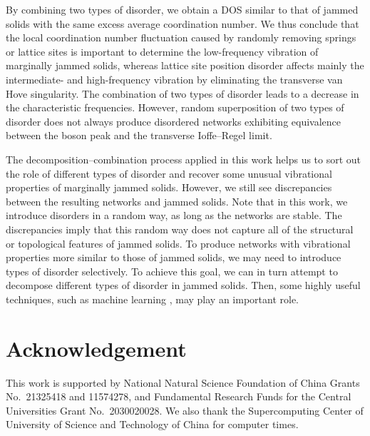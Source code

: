 \documentclass[twocolumn,printnumbers,amsmath,amssymb,prl,verbatim]{revtex4}
\begin{document}
By combining two types of disorder, we obtain a DOS similar to that of jammed solids with the same excess average coordination number. We thus conclude that the local coordination number fluctuation caused by randomly removing springs or lattice sites is important to determine the low-frequency vibration of marginally jammed solids, whereas lattice site position disorder affects mainly the intermediate- and high-frequency vibration by eliminating the transverse van Hove singularity. The combination of two types of disorder leads to a decrease in the characteristic frequencies. However, random superposition of two types of disorder does not always produce disordered networks exhibiting equivalence between the boson peak and the transverse Ioffe--Regel limit.

The decomposition--combination process applied in this work helps us to sort out the role of different types of disorder and recover some unusual vibrational properties of marginally jammed solids. However, we still see discrepancies between the resulting networks and jammed solids. Note that in this work, we introduce disorders in a random way, as long as the networks are stable. The discrepancies imply that this random way does not capture all of the structural or topological features of jammed solids. To produce networks with vibrational properties more similar to those of jammed solids, we may need to introduce types of disorder selectively. To achieve this goal, we can in turn attempt to decompose different types of disorder in jammed solids. Then, some highly useful techniques, such as machine learning \cite{cubuk}, may play an important role.

\section{Acknowledgement}
This work is supported by National Natural Science Foundation of China Grants No.~21325418 and 11574278, and Fundamental Research Funds for the Central Universities Grant No.~2030020028. We also thank the Supercomputing Center of University of Science and Technology of China for computer times.



\end{document}
